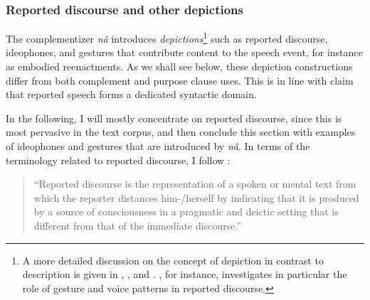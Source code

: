 











\subsubsection{Reported discourse and other depictions}
\label{sec:RD}

The complementizer {\itshape nâ} introduces {\itshape depictions}\footnote{A more detailed discussion on the concept of depiction in contrast to description is given in \citet{clark90}, \citet{guldemann2008}, and \citet{dingemanse2015}. \citet{soulaimani2018}, for instance, investigates in particular the role of gesture and voice patterns in reported discourse.} such as reported discourse, ideophones, and gestures that contribute content to the speech event, for instance as embodied reenactments.
As we shall see below, these depiction constructions differ from both complement and purpose clause uses. This is in line with  claim that reported speech forms a dedicated syntactic domain. 

In the following, I will mostly concentrate on reported discourse, since this is most pervasive in the text corpus, and then conclude this section with examples of ideophones and gestures that are introduced by {\itshape nâ}.
In terms of the terminology related to reported discourse, I follow \citet[6]{guldemann2008}:

\begin{quote}
``Reported discourse is the representation of a spoken or mental text from which the reporter distances him-/herself by indicating that it is produced by a source of consciousness in a pragmatic and deictic setting that is different from that of the immediate discourse.''
\end{quote}

